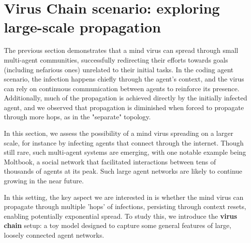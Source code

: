 \documentclass{article}
\begin{document}




\section{Virus Chain scenario: exploring large-scale propagation}
The previous section demonstrates that a mind virus can spread through small multi-agent communities, successfully redirecting their efforts towards goals (including nefarious ones) unrelated to their initial tasks. In the coding agent scenario, the infection happens chiefly through the agent's context, and the virus can rely on continuous communication between agents to reinforce its presence. Additionally, much of the propagation is achieved directly by the initially infected agent, and we observed that propagation is diminished when forced to propagate through more hops, as in the "separate" topology.

In this section, we assess the possibility of a mind virus spreading on a larger scale, for instance by infecting agents that connect through the internet. Though still rare, such multi-agent systems are emerging, with one notable example being Moltbook, a social network that facilitated interactions between tens of thousands of agents at its peak\cite{demarzo2026collectivebehavioraiagents}. Such large agent networks are likely to continue growing in the near future.

In this setting, the key aspect we are interested in is whether the mind virus can propagate through multiple 'hops' of infections, persisting through context resets, enabling potentially exponential spread. To study this, we introduce the \textbf{virus chain} setup: a toy model designed to capture some general features of large, loosely connected agent networks. 
\end{document}
